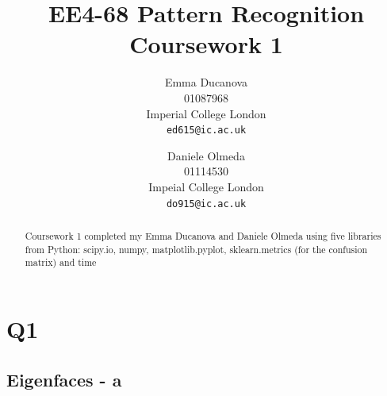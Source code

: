 \documentclass[10pt,twocolumn,letterpaper]{article}
\begin{document}
\title{ EE4-68 Pattern Recognition Coursework 1 }

\author{Emma Ducanova\\
01087968\\
Imperial College London\\
{\tt\small ed615@ic.ac.uk}
\and
Daniele Olmeda\\
01114530\\
Impeial College London\\
{\tt\small do915@ic.ac.uk}
}


\maketitle

\begin{abstract}
   Coursework 1 completed my Emma Ducanova and Daniele Olmeda using five libraries from Python: scipy.io, numpy, matplotlib.pyplot, sklearn.metrics (for the confusion matrix) and time
\end{abstract}

\section{Q1}


\subsection{Eigenfaces - a}
\end{document}
